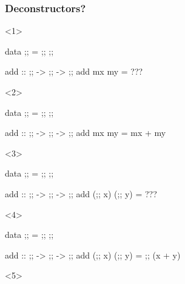 \documentclass[17pt]{beamer}
\renewcommand{\(}[1]{\begin{columns}[#1]}
\renewcommand{\)}{\end{columns}}
\newcommand{\<}[1]{\begin{column}{#1}}
\renewcommand{\>}{\end{column}}
\begin{document}
\begin{frame}[fragile]
\frametitle{Deconstructors?}
\begin{minipage}[t][.4\textheight]{\textwidth}
\begin{onlyenv}<1>
  \begin{code}
    data ;; = ;; ;;

    add :: ;; -> ;; -> ;;
    add mx my = ???
  \end{code}
\end{onlyenv}
\begin{onlyenv}<2>
  \begin{code}
    data ;; = ;; ;;

    add :: ;; -> ;; -> ;;
    add mx my = mx + my
  \end{code}
\end{onlyenv}
\begin{onlyenv}<3>
  \begin{code}
    data ;; = ;; ;;

    add :: ;; -> ;; -> ;;
    add (;; x) (;; y) = ???
  \end{code}
\end{onlyenv}
\begin{onlyenv}<4>
  \begin{code}
    data ;; = ;; ;;

    add :: ;; -> ;; -> ;;
    add (;; x) (;; y) = ;; (x + y)
  \end{code}%
\end{onlyenv}
\begin{onlyenv}<5>
\end{onlyenv}
\end{minipage}
\begin{minipage}[c][.3\textheight]{\textwidth}
\begin{center}
\end{center}
\end{minipage}
\end{frame}
\end{document}
